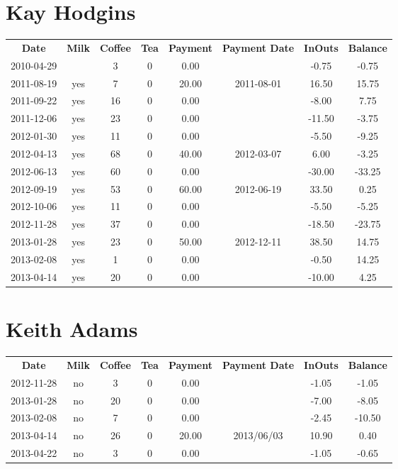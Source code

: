 \section{Kay Hodgins}

\begin{center}
\begin{tabular}{cccccccc}
\textbf{Date} & \textbf{Milk} & \textbf{Coffee} & \textbf{Tea} & \textbf{Payment} & \textbf{Payment Date} & \textbf{InOuts} & \textbf{Balance} \\
2010-04-29 &  &  3 & 0 &  0.00 &  &  -0.75 &  -0.75\\ 
2011-08-19 & yes &  7 & 0 & 20.00 & 2011-08-01 &  16.50 &  15.75\\ 
2011-09-22 & yes & 16 & 0 &  0.00 &  &  -8.00 &   7.75\\ 
2011-12-06 & yes & 23 & 0 &  0.00 &  & -11.50 &  -3.75\\ 
2012-01-30 & yes & 11 & 0 &  0.00 &  &  -5.50 &  -9.25\\ 
2012-04-13 & yes & 68 & 0 & 40.00 & 2012-03-07 &   6.00 &  -3.25\\ 
2012-06-13 & yes & 60 & 0 &  0.00 &  & -30.00 & -33.25\\ 
2012-09-19 & yes & 53 & 0 & 60.00 & 2012-06-19 &  33.50 &   0.25\\ 
2012-10-06 & yes & 11 & 0 &  0.00 &  &  -5.50 &  -5.25\\ 
2012-11-28 & yes & 37 & 0 &  0.00 &  & -18.50 & -23.75\\ 
2013-01-28 & yes & 23 & 0 & 50.00 & 2012-12-11 &  38.50 &  14.75\\ 
2013-02-08 & yes &  1 & 0 &  0.00 &  &  -0.50 &  14.25\\ 
2013-04-14 & yes & 20 & 0 &  0.00 &  & -10.00 &   4.25
\end{tabular}
\end{center}

\section{Keith Adams}

\begin{center}
\begin{tabular}{cccccccc}
\textbf{Date} & \textbf{Milk} & \textbf{Coffee} & \textbf{Tea} & \textbf{Payment} & \textbf{Payment Date} & \textbf{InOuts} & \textbf{Balance} \\
2012-11-28 & no &  3 & 0 &  0.00 &  & -1.05 &  -1.05\\ 
2013-01-28 & no & 20 & 0 &  0.00 &  & -7.00 &  -8.05\\ 
2013-02-08 & no &  7 & 0 &  0.00 &  & -2.45 & -10.50\\ 
2013-04-14 & no & 26 & 0 & 20.00 & 2013/06/03 & 10.90 &   0.40\\ 
2013-04-22 & no &  3 & 0 &  0.00 &  & -1.05 &  -0.65
\end{tabular}
\end{center}

